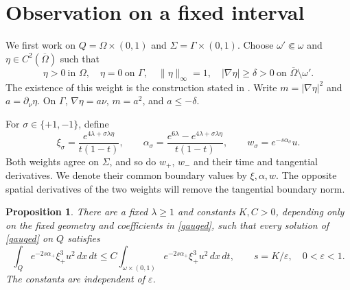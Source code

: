 \documentclass[11pt]{article}
\newtheorem{proposition}[theorem]{Proposition}
\theoremstyle{remark}
\newcommand{\eps}{\varepsilon}
\newcommand{\dd}{\,dx\,dt}
\begin{document}
\section{Observation on a fixed interval}\label{sec:observation}

We first work on $Q=\Omega\times(0,1)$ and
$\Sigma=\Gamma\times(0,1)$. Choose $\omega'\Subset\omega$ and
$\eta\in C^2(\overline\Omega)$ such that
\begin{equation}\label{eta}
 \eta>0\ \text{in }\Omega,\quad \eta=0\ \text{on }\Gamma,
 \quad\|\eta\|_\infty=1,\quad
 |\nabla\eta|\ge\delta>0\ \text{on }\overline\Omega\setminus\omega'.
\end{equation}
The existence of this weight is the construction stated in
\cite[equation (64)]{Outward}. Write
$m=|\nabla\eta|^2$ and $a=\partial_\nu\eta$. On $\Gamma$,
$\nabla\eta=a\nu$, $m=a^2$, and $a\le-\delta$.

For $\sigma\in\{+1,-1\}$, define
\begin{equation}\label{weights}
 \xi_\sigma=\frac{e^{4\lambda+\sigma\lambda\eta}}{t(1-t)},\qquad
 \alpha_\sigma=\frac{e^{6\lambda}-e^{4\lambda+\sigma\lambda\eta}}{t(1-t)},
 \qquad w_\sigma=e^{-s\alpha_\sigma}u.
\end{equation}
Both weights agree on $\Sigma$, and so do $w_+$, $w_-$ and their time and
tangential derivatives. We denote their common boundary values by
$\xi,\alpha,w$. The opposite spatial derivatives of the two weights will
remove the tangential boundary norm.

\begin{proposition}\label{carleman}
There are a fixed $\lambda\ge1$ and constants $K,C>0$, depending only on the
fixed geometry and coefficients in \eqref{gauged}, such that every solution
of \eqref{gauged} on $Q$ satisfies
\begin{equation}\label{weighted-observation}
 \int_Qe^{-2s\alpha_+}\xi_+^3u^2\dd
 \le C\int_{\omega\times(0,1)}e^{-2s\alpha_+}\xi_+^3u^2\dd,
 \qquad s=K/\eps,\quad 0<\eps<1.
\end{equation}
The constants are independent of $\eps$.
\end{proposition}
\end{document}
